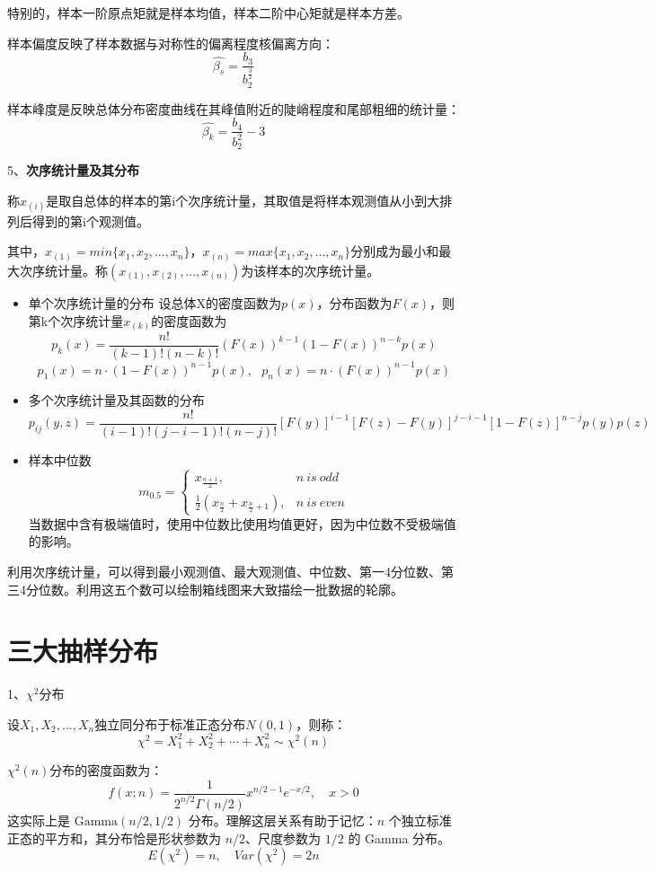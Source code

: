 \documentclass[
]{book}
\begin{document}
特别的，样本一阶原点矩就是样本均值，样本二阶中心矩就是样本方差。

样本偏度反映了样本数据与对称性的偏离程度核偏离方向：
\[
\hat{\beta_s}=\frac{b_3}{b_2^{\frac{3}{2}}}
\]

样本峰度是反映总体分布密度曲线在其峰值附近的陡峭程度和尾部粗细的统计量：
\[
\hat{\beta_k}=\frac{b_4}{b_2^2}-3
\]

5、\textbf{次序统计量及其分布}

称\(x_{(i)}\)是取自总体的样本的第i个次序统计量，其取值是将样本观测值从小到大排列后得到的第i个观测值。

其中，\(x_{(1)}=min\{x_1,x_2,...,x_n\}\)，\(x_{(n)}=max\{x_1,x_2,...,x_n\}\)分别成为最小和最大次序统计量。称\((x_{(1)},x_{(2)},...,x_{(n)})\)为该样本的次序统计量。

\begin{itemize}
\item
  单个次序统计量的分布
  设总体X的密度函数为\(p(x)\)，分布函数为\(F(x)\)，则第k个次序统计量\(x_{(k)}\)的密度函数为
  \[
    p_k(x)=\frac{n!}{{(k-1)!(n-k)!}}(F(x))^{k-1}(1-F(x))^{n-k}p(x)
    \]
  \[
    p_1(x)=n\cdot (1-F(x))^{n-1}p(x),\ \ \ 
    p_n(x)=n\cdot (F(x))^{n-1}p(x)
    \]
\item
  多个次序统计量及其函数的分布
  \[
  p_{ij}(y,z)=\frac{n!}{(i-1)!(j-i-1)!(n-j)!}[F(y)]^{i-1}[F(z)-F(y)]^{j-i-1}[1-F(z)]^{n-j}p(y)p(z)
  \]
\item
  样本中位数
  \[
  m_{0.5}=\begin{cases}
  x_{\frac{n+1}{2}},&n\ is\ odd\\
  \frac{1}{2}(x_{\frac{n}{2}}+x_{\frac{n}{2}+1}),&n\ is\ even
  \end{cases}
  \]
  当数据中含有极端值时，使用中位数比使用均值更好，因为中位数不受极端值的影响。
\end{itemize}

利用次序统计量，可以得到最小观测值、最大观测值、中位数、第一4分位数、第三4分位数。利用这五个数可以绘制箱线图来大致描绘一批数据的轮廓。

\section{三大抽样分布}\label{ux4e09ux5927ux62bdux6837ux5206ux5e03}

1、\(\chi^2\)分布

设\(X_1,X_2,...,X_n\)独立同分布于标准正态分布\(N(0,1)\)，则称：
\[
\chi^2=X_1^2+X_2^2+\cdots+X_n^2\sim\chi^2(n)
\]

\(\chi^2(n)\)分布的密度函数为：
\[
f(x;n)=\frac{1}{2^{n/2}\Gamma(n/2)}x^{n/2-1}e^{-x/2},\quad x>0
\]
这实际上是 \(\text{Gamma}(n/2, 1/2)\) 分布。理解这层关系有助于记忆：\(n\) 个独立标准正态的平方和，其分布恰是形状参数为 \(n/2\)、尺度参数为 \(1/2\) 的 Gamma 分布。
\[
E(\chi^2)=n,\quad Var(\chi^2)=2n
\]
\end{document}
